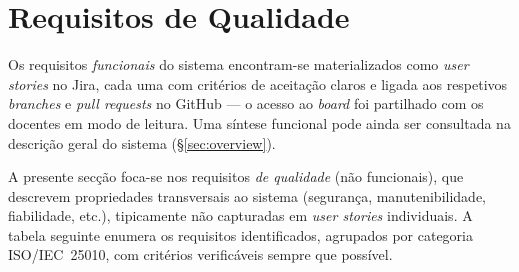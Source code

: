 \documentclass[11pt,a4paper]{article}
\begin{document}
\section{Requisitos de Qualidade}\label{sec:req}

Os requisitos \emph{funcionais} do sistema encontram-se materializados como
\emph{user stories} no Jira, cada uma com critérios de aceitação claros e
ligada aos respetivos \emph{branches} e \emph{pull requests} no GitHub --- o
acesso ao \emph{board} foi partilhado com os docentes em modo de leitura.
Uma síntese funcional pode ainda ser consultada na descrição geral do
sistema (\S\ref{sec:overview}).

A presente secção foca-se nos requisitos \emph{de qualidade} (não
funcionais), que descrevem propriedades transversais ao sistema (segurança,
manutenibilidade, fiabilidade, etc.), tipicamente não capturadas em
\emph{user stories} individuais. A tabela seguinte enumera os requisitos
identificados, agrupados por categoria ISO/IEC~25010, com critérios
verificáveis sempre que possível.
\end{document}
